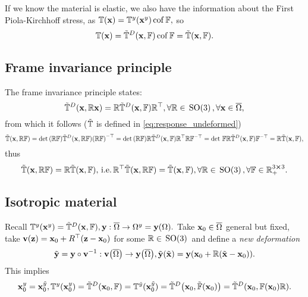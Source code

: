 \documentclass[reqno, a4paper]{article}
\begin{document}
\begin{remark}
	If we know the material is elastic, we also have the information about the First Piola-Kirchhoff stress, as $\mathbb{T}\qty(\vb{x}) = \mathbb{T}^y\qty(\vb{x}^{y})\operatorname{cof} \mathbb{F},$ so
	\begin{equation}
		\label{eq:response_undeformed}
		\mathbb{T}\qty(\vb{x}) = \tilde{\mathbb{T}}^D\qty(\vb{x}, \mathbb{F}) \operatorname{cof} \mathbb{F} = \tilde{\mathbb{T}}\qty(\vb{x},\mathbb{F}).
	\end{equation}
\end{remark}

\subsection{Frame invariance principle}
\label{sec:frame_invariance}
The frame invariance principle states:
\[
	\tilde{\mathbb{T}}^D\qty(\vb{x}, \mathbb{R} \vb{x}) = \mathbb{R}\tilde{\mathbb{T}}^D\qty(\vb{x},\mathbb{F})\mathbb{R}^\top, \forall \mathbb{R}\in \, \text{SO(3)} \,, \forall \vb{x}\in \overline{\Omega},
\]
from which it follows ($\tilde{\mathbb{T}}$ is defined in \ref{eq:response_undeformed})
\[
	\tilde{\mathbb{T}}\qty(\vb{x}, \mathbb{R} \mathbb{F}) = \det\qty(\mathbb{R} \mathbb{F}) \tilde{\mathbb{T}}^D\qty(\vb{x}, \mathbb{R}\mathbb{F})\qty(\mathbb{R} \mathbb{F})^{-\top} = \det\qty(\mathbb{R} \mathbb{F}) \mathbb{R} \tilde{\mathbb{T}}^D(\vb{x},\mathbb{F}) \mathbb{R}^\top \mathbb{R} \mathbb{F}^{-\top} = \det\, \mathbb{F} \mathbb{R}\tilde{\mathbb{T}}^D\qty(\vb{x},\mathbb{F})\mathbb{F}^{-\top}=\mathbb{R}\tilde{\mathbb{T}}\qty(\vb{x},\mathbb{F}),
\]
thus
\[
	\tilde{\mathbb{T}}\qty(\vb{x}, \mathbb{R} \mathbb{F}) = \mathbb{R}\tilde{\mathbb{T}}\qty(\vb{x},\mathbb{F}), \, \text{i.e.} \, \mathbb{R}^\top\tilde{\mathbb{T}}\qty(\vb{x},\mathbb{R}\mathbb{F}) = \tilde{\mathbb{T}}\qty(\vb{x},\mathbb{F}), \forall \mathbb{R} \in \, \text{SO(3)} \,, \forall \mathbb{F} \in {\mathbb R}^{3 \cross 3}_+.
\]

\subsection{Isotropic material}
\label{sec:isotropic_materials}
Recall $\mathbb{T}^y(\vb{x}^{y})=\tilde{\mathbb{T}}^D\qty(\vb{x},\mathbb{F}), \vb{y}:\overline{\Omega} \to \Omega^y = \vb{y}(\Omega).$ Take $\vb{x}_0 \in \overline{\Omega}$ general but fixed, take $\vb{v}\qty(\vb{z})=\vb{x}_0 + R^\top\qty(\vb{z}-\vb{x}_0)$ for some $\mathbb{R} \in \, \text{SO(3)} \,$ and define a \textit{new deformation}
\[
	\tilde{\vb{y}}=\vb{y}\circ \vb{v}^{-1}: \vb{v}\qty(\overline{\Omega}) \to \vb{y}\qty(\overline{\Omega}), \tilde{\vb{y}}\qty(\tilde{\vb{x}})=\vb{y}\qty(\vb{x}_0+\mathbb{R}\qty(\tilde{\vb{x}}-\vb{x}_0)).
\]
This implies
\[
	\vb{x}_0^{y} = \vb{x}_0^{\tilde{y}}, \mathbb{T}^y\qty(\vb{x}_0^{y})=\tilde{\mathbb{T}}^D\qty(\vb{x}_0, \mathbb{F})= \mathbb{T}^{\tilde{y}}(\vb{x}^{\tilde{y}}_0) = \tilde{\mathbb{T}}^D\qty(\vb{x}_0, \tilde{\mathbb{F}}\qty(\vb{x}_0)) = \tilde{\mathbb{T}}^D\qty(\vb{x}_0, \mathbb{F}\qty(\vb{x}_0) \mathbb{R}).
\]
\end{document}
